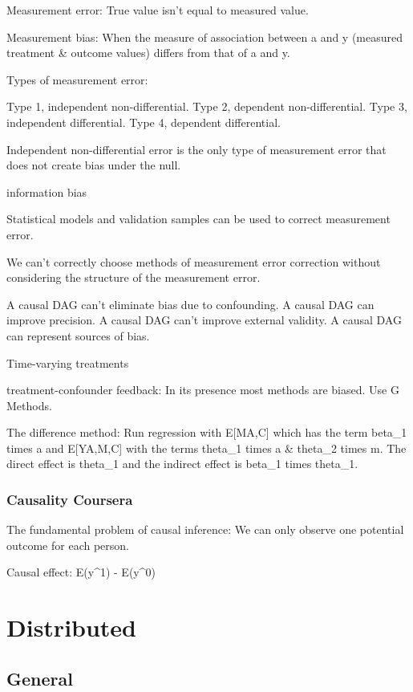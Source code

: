 \documentclass[]{book}
\begin{document}
Measurement error: True value isn't equal to measured value.

Measurement bias: When the measure of association between a and y
(measured treatment \& outcome values) differs from that of a and y.

Types of measurement error:

Type 1, independent non-differential. Type 2, dependent
non-differential. Type 3, independent differential. Type 4, dependent
differential.

Independent non-differential error is the only type of measurement error
that does not create bias under the null.

information bias

Statistical models and validation samples can be used to correct
measurement error.

We can't correctly choose methods of measurement error correction
without considering the structure of the measurement error.

A causal DAG can't eliminate bias due to confounding. A causal DAG can
improve precision. A causal DAG can't improve external validity. A
causal DAG can represent sources of bias.

Time-varying treatments

treatment-confounder feedback: In its presence most methods are biased.
Use G Methods.

The difference method: Run regression with E{[}M\textbar{}A,C{]} which
has the term beta\_1 times a and E{[}Y\textbar{}A,M,C{]} with the terms
theta\_1 times a \& theta\_2 times m. The direct effect is theta\_1 and
the indirect effect is beta\_1 times theta\_1.

\subsection{Causality Coursera}\label{causality-coursera}

The fundamental problem of causal inference: We can only observe one
potential outcome for each person.

Causal effect: E(y\^{}1) - E(y\^{}0)

\chapter{Distributed}\label{distributed}

\section{General}\label{general-11}
\end{document}
